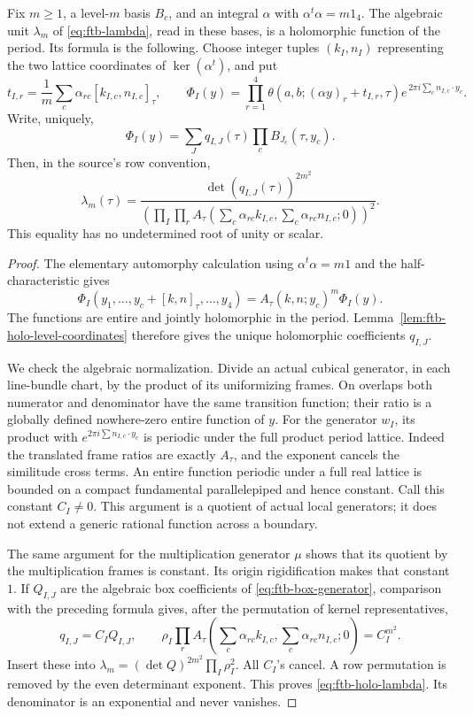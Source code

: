 \begin{srlemma}
\label{lem:ftb-holo-box}
Fix \(m\geq1\), a level-\(m\) basis \(B_c\), and an integral
\(\alpha\) with \(\alpha^t\alpha=m1_4\).
The algebraic unit \(\lambda_m\) of
\eqref{eq:ftb-lambda}, read in these bases, is a holomorphic
function of the period.  Its formula is the following.
Choose integer tuples \((k_I,n_I)\) representing the two lattice
coordinates of \(\ker(\alpha^t)\), and put
\[
 t_{I,r}=\frac1m\sum_c\alpha_{rc}[k_{I,c},n_{I,c}]_\tau,\qquad
 \Phi_I(y)=
 \prod_{r=1}^4\theta(a,b;(\alpha y)_r+t_{I,r},\tau)
             e^{\,2\pi i\sum_c n_{I,c}\cdot y_c}.
\]
Write, uniquely,
\[
 \Phi_I(y)=\sum_J q_{I,J}(\tau)\prod_cB_{J_c}(\tau,y_c).
\]
Then, in the source's row convention,
\[
 \lambda_m(\tau)=
 \frac{\det(q_{I,J}(\tau))^{2m^2}}
 {\displaystyle
  \left(\prod_I\prod_r
 A_\tau\!\left(\sum_c\alpha_{rc}k_{I,c},
              \sum_c\alpha_{rc}n_{I,c};0\right)\right)^2}.
 \tag{H5}\label{eq:ftb-holo-lambda}
\]
This equality has no undetermined root of unity or scalar.
\end{srlemma}
\begin{proof}
The elementary automorphy calculation using
\(\alpha^t\alpha=m1\) and the half-characteristic gives
\[
 \Phi_I(y_1,\ldots,y_c+[k,n]_\tau,\ldots,y_4)
             =A_\tau(k,n;y_c)^m\Phi_I(y).
\]
The functions are entire and jointly holomorphic in the period.
Lemma~\ref{lem:ftb-holo-level-coordinates} therefore gives the
unique holomorphic coefficients \(q_{I,J}\).

We check the algebraic normalization.  Divide an actual cubical
generator, in each line-bundle chart, by the product of its
uniformizing frames.  On overlaps both numerator and denominator
have the same transition function; their ratio is a globally
defined nowhere-zero entire function of \(y\).
For the generator \(w_I\), its product with
\(e^{2\pi i\sum n_{I,c}\cdot y_c}\) is periodic under the full
product period lattice.  Indeed the translated frame ratios
are exactly \(A_\tau\), and the exponent cancels the
similitude cross terms.  An entire function periodic under a full
real lattice is bounded on a compact fundamental parallelepiped
and hence constant.  Call this constant \(C_I\ne0\).
This argument is a quotient of actual local generators;
it does not extend a generic rational function across a boundary.

The same argument for the multiplication generator \(\mu\) shows
that its quotient by the multiplication frames is constant.
Its origin rigidification makes that constant \(1\).
If \(Q_{I,J}\) are the algebraic box coefficients of
\eqref{eq:ftb-box-generator}, comparison with the preceding
formula gives, after the permutation of kernel representatives,
\[
 q_{I,J}=C_IQ_{I,J},\qquad
 \rho_I
 \prod_r A_\tau\!\left(\sum_c\alpha_{rc}k_{I,c},
                     \sum_c\alpha_{rc}n_{I,c};0\right)
                                  =C_I^{m^2}.
\]
Insert these into
\(\lambda_m=(\det Q)^{2m^2}\prod_I\rho_I^2\).
All \(C_I\)'s cancel.  A row permutation is removed by the even
determinant exponent.  This proves \eqref{eq:ftb-holo-lambda}.
Its denominator is an exponential and never vanishes.
\end{proof}

